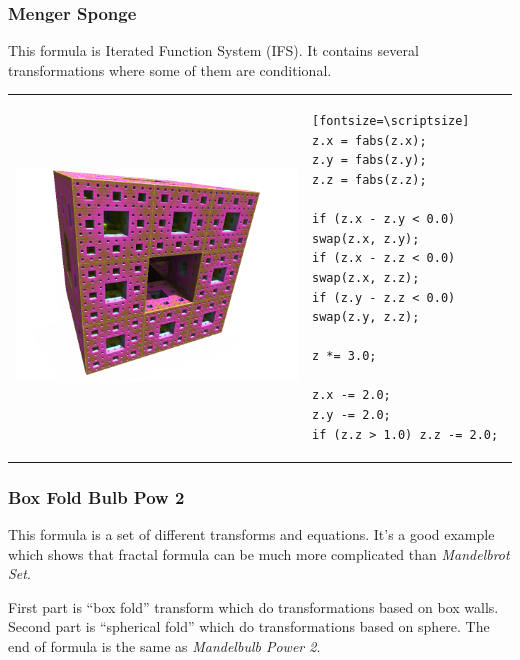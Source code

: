 \subsubsection{Menger Sponge}
\nopagebreak

This formula is Iterated Function System (IFS). It contains several transformations where some of them are conditional.
\nopagebreak

\begin{tabular}{l l}
	\includegraphics[width=0.3\linewidth]{img/manual/media/formula_menger_sponge.png}	
	& 
	\begin{minipage}[b]{0.5\linewidth}
		\begin{verbatim}[fontsize=\scriptsize]
z.x = fabs(z.x);
z.y = fabs(z.y);
z.z = fabs(z.z);
		
if (z.x - z.y < 0.0) swap(z.x, z.y);
if (z.x - z.z < 0.0) swap(z.x, z.z);
if (z.y - z.z < 0.0) swap(z.y, z.z);
		
z *= 3.0;
		
z.x -= 2.0;
z.y -= 2.0;
if (z.z > 1.0) z.z -= 2.0;
		\end{verbatim}
	\end{minipage}
\end{tabular} 

\subsubsection{Box Fold Bulb Pow 2}
\nopagebreak

This formula is a set of different transforms and equations. It's a good example which shows that fractal formula can be much more complicated than \emph{Mandelbrot Set}. 

First part is ``box fold'' transform which do transformations based on box walls. Second part is ``spherical fold'' which do transformations based on sphere. The end of formula is the same as \emph{Mandelbulb Power 2}. 
\nopagebreak

